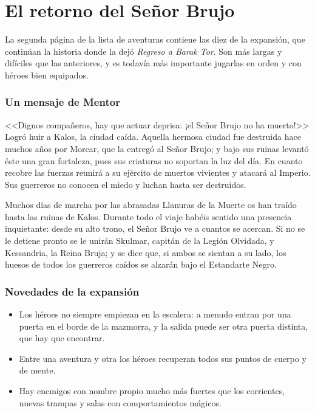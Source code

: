 \chapter{El retorno del Señor Brujo}


La segunda página de la lista de aventuras contiene las diez de la
expansión, que continúan la historia donde la dejó \textit{Regreso a Barak
Tor}. Son más largas y difíciles que las anteriores, y es todavía más
importante jugarlas en orden y con héroes bien equipados.


\subsection*{Un mensaje de Mentor}

<<Dignos compañeros, hay que actuar deprisa: ¡el Señor Brujo no ha
muerto!>> Logró huir a Kalos, la ciudad caída. Aquella hermosa ciudad fue
destruida hace muchos años por Morcar, que la entregó al Señor Brujo; y
bajo sus ruinas levantó éste una gran fortaleza, pues sus criaturas no
soportan la luz del día. En cuanto recobre las fuerzas reunirá a su
ejército de muertos vivientes y atacará al Imperio. Sus guerreros no
conocen el miedo y luchan hasta ser destruidos.

Muchos días de marcha por las abrasadas Llanuras de la Muerte os han
traído hasta las ruinas de Kalos. Durante todo el viaje habéis sentido una
presencia inquietante: desde su alto trono, el Señor Brujo ve a cuantos se
acercan. Si no se le detiene pronto se le unirán Skulmar, capitán de la
Legión Olvidada, y Kessandria, la Reina Bruja; y se dice que, si ambos se
sientan a su lado, los huesos de todos los guerreros caídos se alzarán
bajo el Estandarte Negro.

\subsection*{Novedades de la expansión}

\begin{itemize}
\item Los héroes no siempre empiezan en la escalera: a menudo entran por
  una puerta en el borde de la mazmorra, y la salida puede ser otra puerta
  distinta, que hay que encontrar.
\item Entre una aventura y otra los héroes recuperan todos sus puntos de
  cuerpo y de mente.
\item Hay enemigos con nombre propio mucho más fuertes que los corrientes,
  nuevas trampas y salas con comportamientos mágicos.
\end{itemize}

